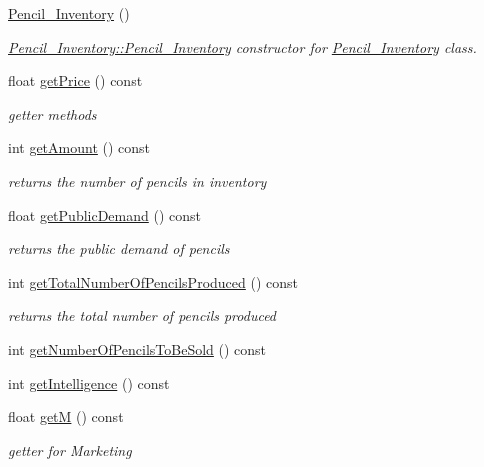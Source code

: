 \begin{DoxyCompactItemize}
\item 
\mbox{\hyperlink{classPencil__Inventory_a68480c5a7aa85cee3cb19619115ad552}{Pencil\+\_\+\+Inventory}} ()
\begin{DoxyCompactList}\small\item\em \mbox{\hyperlink{classPencil__Inventory_a68480c5a7aa85cee3cb19619115ad552}{Pencil\+\_\+\+Inventory\+::\+Pencil\+\_\+\+Inventory}} constructor for \mbox{\hyperlink{classPencil__Inventory}{Pencil\+\_\+\+Inventory}} class. \end{DoxyCompactList}\item 
float \mbox{\hyperlink{classPencil__Inventory_a0ce9e6370396e24ae4d11b27b84c7160}{get\+Price}} () const
\begin{DoxyCompactList}\small\item\em getter methods \end{DoxyCompactList}\item 
int \mbox{\hyperlink{classPencil__Inventory_a493a0967a8369d5b8c3e3709eeb21b5e}{get\+Amount}} () const
\begin{DoxyCompactList}\small\item\em returns the number of pencils in inventory \end{DoxyCompactList}\item 
float \mbox{\hyperlink{classPencil__Inventory_ac9bab24db01e4515abe06a3c5ec48fcf}{get\+Public\+Demand}} () const
\begin{DoxyCompactList}\small\item\em returns the public demand of pencils \end{DoxyCompactList}\item 
int \mbox{\hyperlink{classPencil__Inventory_ad7efa852dea32675f689e36c0ddfd7a7}{get\+Total\+Number\+Of\+Pencils\+Produced}} () const
\begin{DoxyCompactList}\small\item\em returns the total number of pencils produced \end{DoxyCompactList}\item 
int \mbox{\hyperlink{classPencil__Inventory_a3cd52fbcbd4e3bedbcbe2031cb9a3286}{get\+Number\+Of\+Pencils\+To\+Be\+Sold}} () const
\item 
int \mbox{\hyperlink{classPencil__Inventory_a7a46e70894e06409c312be8fc87628bb}{get\+Intelligence}} () const
\item 
float \mbox{\hyperlink{classPencil__Inventory_afb3b97fbc0bcac1bdce65e088dc1e52f}{getM}} () const
\begin{DoxyCompactList}\small\item\em getter for Marketing \end{DoxyCompactList}\item 

\end{DoxyCompactItemize}

